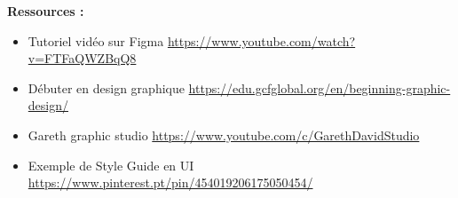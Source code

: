 \textbf{Ressources :}

\begin{itemize}
\item Tutoriel vidéo sur Figma \url{https://www.youtube.com/watch?v=FTFaQWZBqQ8}
\item Débuter en design graphique \url{https://edu.gcfglobal.org/en/beginning-graphic-design/}
\item Gareth graphic studio \url{https://www.youtube.com/c/GarethDavidStudio}
\item Exemple de Style Guide en UI \url{https://www.pinterest.pt/pin/454019206175050454/}
\end{itemize}

